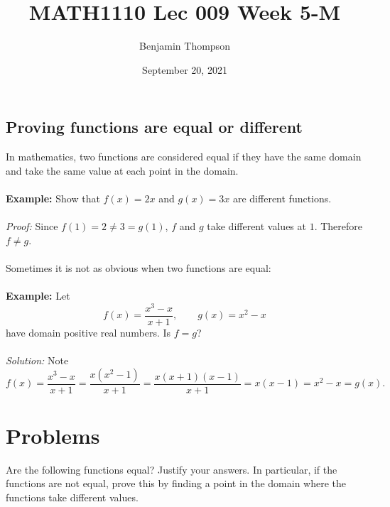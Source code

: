 \documentclass[12pt,a4paper]{article}
\title{MATH1110 Lec 009 Week 5-M}
\author{Benjamin Thompson}
\date{September 20, 2021}
\begin{document}
\subsection*{Proving functions are equal or different}
In mathematics, two functions are considered equal if they have the same domain and take the same value at each point in the domain.
\\
\\
\textbf{Example:} Show that $f(x) = 2x$ and $g(x) = 3x$ are different functions.
\\
\\
\emph{Proof:} Since $f(1) = 2 \ne 3 = g(1)$, $f$ and $g$ take different values at $1$. Therefore $f \ne g$.
\\
\\
Sometimes it is not as obvious when two functions are equal:
\\
\\
\textbf{Example:} Let
\[
    f(x) = \frac{x^3 - x}{x + 1}, \qquad g(x) = x^2 - x
\]
have domain positive real numbers. Is $f = g$?
\\
\\
\emph{Solution:} 
Note
\[
    f(x) = \frac{x^3 - x}{x+1} = \frac{x(x^2 - 1)}{x+1} = \frac{x(x+1)(x-1)}{x+1} = x(x-1) = x^2 - x = g(x).
\]

\section*{Problems}
Are the following functions equal? Justify your answers. In particular, if the functions are not equal, prove this by finding a point in the domain where the functions take different values.
\end{document}
